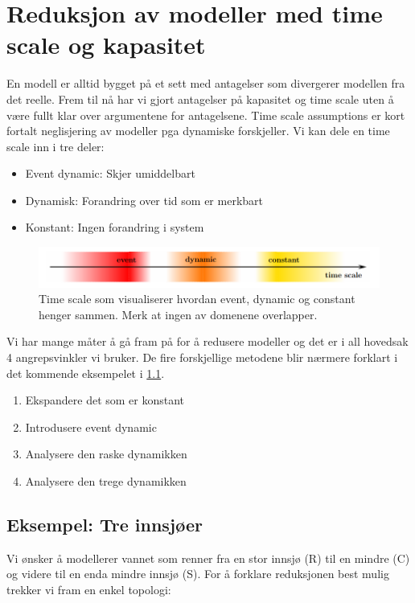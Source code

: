 \clearpage
\section{Reduksjon av modeller med time scale og kapasitet}\label{sec:timescale}
En modell er alltid bygget på et sett med antagelser som divergerer modellen fra det reelle. Frem til nå har vi gjort antagelser på kapasitet og time scale uten å være fullt klar over argumentene for antagelsene. Time scale assumptions er kort fortalt neglisjering av modeller pga dynamiske forskjeller. Vi kan dele en time scale inn i tre deler:


\begin{itemize}
    \item Event dynamic: Skjer  umiddelbart
    \item Dynamisk: Forandring over tid som er merkbart
    \item Konstant: Ingen forandring i system
\end{itemize}

\begin{figure}[H]
    \centering
    \includegraphics[scale=0.5]{Figures/time_scale}
    \caption{Time scale som visualiserer hvordan event, dynamic og constant henger sammen. Merk at ingen av domenene overlapper.}
    \label{fig:time_scale}
\end{figure}


Vi har mange måter å gå fram på for å redusere modeller og det er i all hovedsak 4 angrepsvinkler vi bruker. De fire forskjellige metodene blir nærmere forklart i det kommende eksempelet i \cref{sec:tre_sjo}. 
\begin{enumerate}
    \label{lst:reduction}
    \item Ekspandere det som er konstant
    \item Introdusere event dynamic
    \item Analysere den raske dynamikken
    \item Analysere den trege dynamikken
\end{enumerate}

\subsection{Eksempel: Tre innsjøer}\label{sec:tre_sjo}
Vi ønsker å modellerer vannet som renner fra en stor innsjø (R) til en mindre (C) og videre til en enda mindre innsjø (S). For å forklare reduksjonen best mulig trekker vi fram en enkel topologi:



